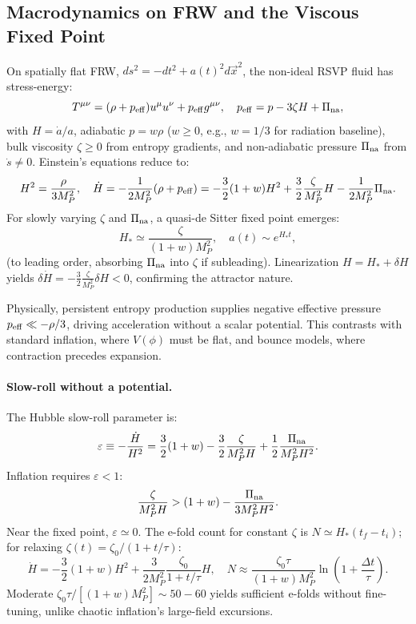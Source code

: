 \documentclass[12pt, a4paper, openany]{book}
\theoremstyle{definition}
\begin{document}
\subsection{Macrodynamics on FRW and the Viscous Fixed Point}
On spatially flat FRW, $ds^2 = -dt^2 + a(t)^2 d\vec{x}^2$, the non-ideal RSVP fluid has stress-energy:
\begin{equation}
T^{\mu\nu} = (\rho + p_{\rm eff}) u^\mu u^\nu + p_{\rm eff} g^{\mu\nu}, \quad p_{\rm eff} = p - 3 \zeta H + \Pi_{\rm na},
\end{equation}
with $H = \dot{a}/a$, adiabatic $p = w \rho$ ($w \ge 0$, e.g., $w = 1/3$ for radiation baseline), bulk viscosity $\zeta \ge 0$ from entropy gradients, and non-adiabatic pressure $\Pi_{\rm na}$ from $\dot{s} \ne 0$. Einstein’s equations reduce to:
\begin{equation}
H^2 = \frac{\rho}{3 M_P^2}, \quad \dot{H} = -\frac{1}{2 M_P^2} (\rho + p_{\rm eff}) = -\frac{3}{2} (1+w) H^2 + \frac{3}{2} \frac{\zeta}{M_P^2} H - \frac{1}{2 M_P^2} \Pi_{\rm na}.
\label{eq:Hdot-viscous}
\end{equation}
For slowly varying $\zeta$ and $\Pi_{\rm na}$, a quasi-de Sitter fixed point emerges:
\begin{equation}
H_* \simeq \frac{\zeta}{(1+w) M_P^2}, \quad a(t) \sim e^{H_* t},
\end{equation}
(to leading order, absorbing $\Pi_{\rm na}$ into $\zeta$ if subleading). Linearization $H = H_* + \delta H$ yields $\delta \dot{H} = -\frac{3}{2} \frac{\zeta}{M_P^2} \delta H < 0$, confirming the attractor nature.

Physically, persistent entropy production supplies negative effective pressure $p_{\rm eff} \ll -\rho/3$, driving acceleration without a scalar potential. This contrasts with standard inflation, where $V(\phi)$ must be flat, and bounce models, where contraction precedes expansion.

\paragraph{Slow-roll without a potential.}
The Hubble slow-roll parameter is:
\begin{equation}
\varepsilon \equiv -\frac{\dot{H}}{H^2} = \frac{3}{2} (1+w) - \frac{3}{2} \frac{\zeta}{M_P^2 H} + \frac{1}{2} \frac{\Pi_{\rm na}}{M_P^2 H^2}.
\end{equation}
Inflation requires $\varepsilon < 1$:
\begin{equation}
\frac{\zeta}{M_P^2 H} > (1+w) - \frac{\Pi_{\rm na}}{3 M_P^2 H^2}.
\end{equation}
Near the fixed point, $\varepsilon \simeq 0$. The e-fold count for constant $\zeta$ is $N \simeq H_* (t_f - t_i)$; for relaxing $\zeta(t) = \zeta_0 / (1 + t/\tau)$:
\begin{equation}
\dot{H} = -\frac{3}{2} (1+w) H^2 + \frac{3}{2 M_P^2} \frac{\zeta_0}{1 + t/\tau} H, \quad N \approx \frac{\zeta_0 \tau}{(1+w) M_P^2} \ln\left(1 + \frac{\Delta t}{\tau}\right).
\end{equation}
Moderate $\zeta_0 \tau / [(1+w) M_P^2] \sim 50-60$ yields sufficient e-folds without fine-tuning, unlike chaotic inflation's large-field excursions.
\end{document}
